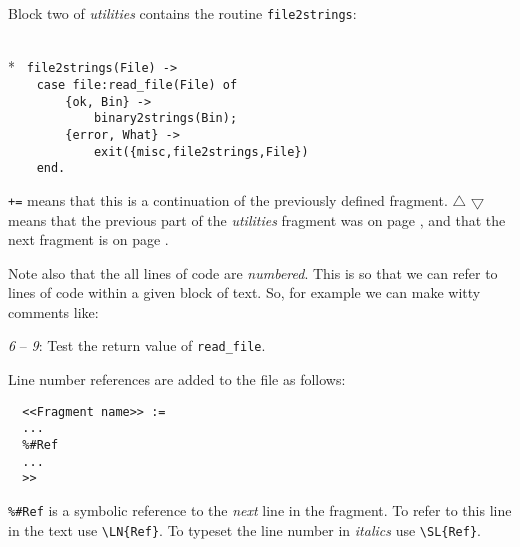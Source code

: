 Block two of {\sl utilities\/} contains the routine \verb+file2strings+:

\begin{flushleft}
\label{utilities_2_8}
\\*
\tt
\noindent{}%
\verb&file2strings(File) ->&\\
\noindent{}%
\verb&    case file:read_file(File) of&\\
\noindent{}%
\verb&        {ok, Bin} ->&\\
\noindent{}%
\verb&            binary2strings(Bin);&\\
\noindent{}%
\verb&        {error, What} ->&\\
\noindent{}%
\verb&            exit({misc,file2strings,File})&\\
\noindent{}%
\verb&    end.&\\
\end{flushleft}

  \verb|+=| means that  this   is  a continuation of   the  previously
defined      fragment.   $\bigtriangleup$    \pageref{utilities_start}
$\bigtriangledown$  \pageref{utilities_3_8} means   that the  previous
part   of   the   {\sl      utilities\/}   fragment   was   on    page
\pageref{utilities_start},  and  that  the next  fragment    is  on  page
\pageref{utilities_3_8}.

Note also that the all lines of code are {\sl numbered}. This
is so that we can refer to lines of code within a given block of text.
So, for example we can make witty comments like:

{\sl 6} -- {\sl 9}: Test the return value of \verb+read_file+.

Line number references are added to the file as follows:

\begin{verbatim}
  <<Fragment name>> :=
  ...
  %#Ref
  ...
  >>
\end{verbatim}

\verb+%#Ref+ is a symbolic reference to the {\sl next} line in the
fragment. To refer to this line in the text use \verb+\L+\verb+N{Ref}+.
To typeset the line number in {\sl italics\/} use
\verb+\S+\verb+L{Ref}+.

